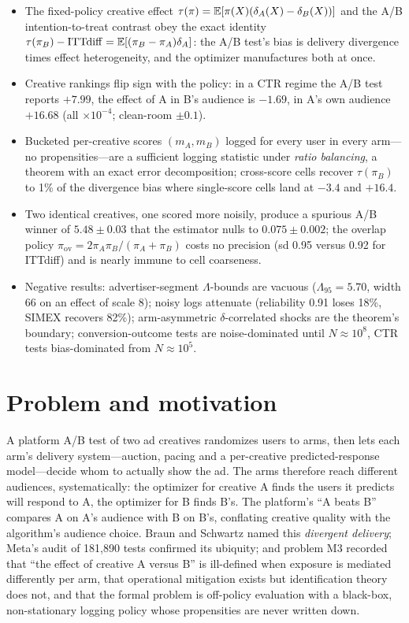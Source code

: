 \begin{keyideas}
\begin{itemize}
\item The fixed-policy creative effect $\tau(\pi) = \mathbb{E}[\pi(X)(\delta_A(X) - \delta_B(X))]$ and the A/B intention-to-treat contrast obey the exact identity $\tau(\pi_B) - \mathrm{ITTdiff} = \mathbb{E}[(\pi_B - \pi_A)\delta_A]$: the A/B test's bias is delivery divergence times effect heterogeneity, and the optimizer manufactures both at once.
\item Creative rankings flip sign with the policy: in a CTR regime the A/B test reports $+7.99$, the effect of A in B's audience is $-1.69$, in A's own audience $+16.68$ (all $\times 10^{-4}$; clean-room $\pm 0.1$).
\item Bucketed per-creative scores $(m_A, m_B)$ logged for every user in every arm---no propensities---are a sufficient logging statistic under \emph{ratio balancing}, a theorem with an exact error decomposition; cross-score cells recover $\tau(\pi_B)$ to 1\% of the divergence bias where single-score cells land at $-3.4$ and $+16.4$.
\item Two identical creatives, one scored more noisily, produce a spurious A/B winner of $5.48 \pm 0.03$ that the estimator nulls to $0.075 \pm 0.002$; the overlap policy $\pi_{\mathrm{ov}} = 2\pi_A\pi_B/(\pi_A + \pi_B)$ costs no precision (sd 0.95 versus 0.92 for ITTdiff) and is nearly immune to cell coarseness.
\item Negative results: advertiser-segment $\Lambda$-bounds are vacuous ($\Lambda_{95} = 5.70$, width 66 on an effect of scale 8); noisy logs attenuate (reliability 0.91 loses 18\%, SIMEX recovers 82\%); arm-asymmetric $\delta$-correlated shocks are the theorem's boundary; conversion-outcome tests are noise-dominated until $N \approx 10^8$, CTR tests bias-dominated from $N \approx 10^5$.
\end{itemize}
\end{keyideas}

\section{Problem and motivation}

A platform A/B test of two ad creatives randomizes users to arms, then lets each arm's delivery system---auction, pacing and a per-creative predicted-response model---decide whom to actually show the ad. The arms therefore reach different audiences, systematically: the optimizer for creative A finds the users it predicts will respond to A, the optimizer for B finds B's. The platform's ``A beats B'' compares A on A's audience with B on B's, conflating creative quality with the algorithm's audience choice. Braun and Schwartz named this \emph{divergent delivery}; Meta's audit of 181{,}890 tests confirmed its ubiquity; and problem M3 recorded that ``the effect of creative A versus B'' is ill-defined when exposure is mediated differently per arm, that operational mitigation exists but identification theory does not, and that the formal problem is off-policy evaluation with a black-box, non-stationary logging policy whose propensities are never written down.

